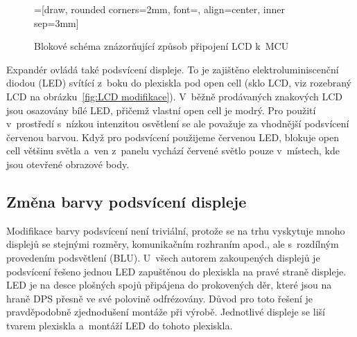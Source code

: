 \begin{figure}[htbp]
    \centering
    =[draw, rounded corners=2mm, font={\bfseries}, align=center, inner sep=3mm]
    \caption{Blokové schéma znázorňující způsob připojení LCD k~MCU}
    \label{fig:LCD blok}
\end{figure}


Expandér ovládá také podsvícení displeje. To je zajištěno elektroluminiscenční
diodou (LED) svítící z~boku do plexiskla pod open cell (sklo LCD, viz rozebraný
LCD na obrázku~\vref{fig:LCD modifikace}). V~běžně prodávaných znakových LCD
jsou osazovány bílé LED, přičemž vlastní open cell je modrý. Pro použití
v~prostředí s~nízkou intenzitou osvětlení se ale považuje za vhodnější
podsvícení červenou barvou. Když pro
podsvícení použijeme červenou LED, blokuje open cell většinu světla a~ven
z~panelu vychází červené světlo pouze v~místech, kde jsou otevřené obrazové
body.

\subsection{Změna barvy podsvícení displeje}
Modifikace barvy podsvícení není triviální, protože se na trhu vyskytuje mnoho
displejů se stejnými rozměry, komunikačním rozhraním apod., ale s~rozdílným
provedením podsvětlení (\acs{BLU}). U~všech autorem zakoupených displejů je
podsvícení řešeno jednou LED zapuštěnou do plexiskla na pravé straně displeje.
LED je na desce plošných spojů připájena do prokovených děr, které jsou na
hraně DPS přesně ve své polovině odfrézovány. Důvod pro toto řešení je
pravděpodobně zjednodušení montáže při výrobě. Jednotlivé displeje se liší
tvarem plexiskla a~montáží LED do tohoto plexiskla.

